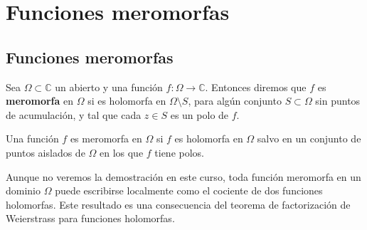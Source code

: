 \section{Funciones meromorfas}

\subsection{Funciones meromorfas}

\begin{definición} 
    Sea $\Omega \subset \mathbb{C}$ un abierto y una función $f: \Omega \to \mathbb{C}$. Entonces diremos que $f$ es \textbf{meromorfa} en $\Omega$ si es holomorfa en $\Omega \setminus S$, para algún conjunto $S \subset \Omega$ sin puntos de acumulación, y tal que cada $z \in S$ es un polo de $f$.
\end{definición}

\begin{observación}
    Una función $f$ es meromorfa en $\Omega$ si $f$ es holomorfa en $\Omega$ salvo en un conjunto de puntos aislados de $\Omega$ en los que $f$ tiene polos.
\end{observación}


Aunque no veremos la demostración en este curso, toda función meromorfa en un dominio $\Omega$ puede escribirse localmente como el cociente de dos funciones holomorfas. Este resultado es una consecuencia del teorema de factorización de Weierstrass para funciones holomorfas.

